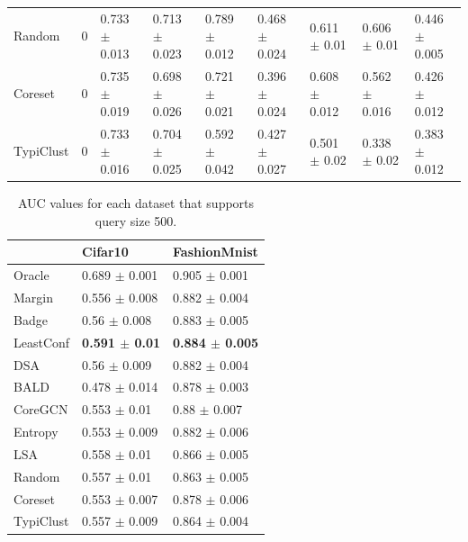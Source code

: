 \documentclass[]{article}
\begin{document}
\begin{table}[H]
{\begin{tabular}{l|llllllll}
			Random & 0 & 0.733 $\pm$ {\small 0.013} & 0.713 $\pm$ {\small 0.023} & 0.789 $\pm$ {\small 0.012} & 0.468 $\pm$ {\small 0.024} & 0.611 $\pm$ {\small 0.01} & 0.606 $\pm$ {\small 0.01} & 0.446 $\pm$ {\small 0.005} \\
			Coreset & 0 & 0.735 $\pm$ {\small 0.019} & 0.698 $\pm$ {\small 0.026} & 0.721 $\pm$ {\small 0.021} & 0.396 $\pm$ {\small 0.024} & 0.608 $\pm$ {\small 0.012} & 0.562 $\pm$ {\small 0.016} & 0.426 $\pm$ {\small 0.012} \\
			TypiClust & 0 & 0.733 $\pm$ {\small 0.016} & 0.704 $\pm$ {\small 0.025} & 0.592 $\pm$ {\small 0.042} & 0.427 $\pm$ {\small 0.027} & 0.501 $\pm$ {\small 0.02} & 0.338 $\pm$ {\small 0.02} & 0.383 $\pm$ {\small 0.012} \\
		\end{tabular}
	}
\end{table}
\begin{minipage}{0.47\linewidth}
	\begin{table}[H]
		\caption{AUC values for each dataset that supports query size 500.}
		\begin{tabular}{l|ll}
			& Cifar10 & FashionMnist \\
			\hline
			Oracle & 0.689 $\pm$ {\small 0.001} & 0.905 $\pm$ {\small 0.001} \\
			Margin & 0.556 $\pm$ {\small 0.008} & 0.882 $\pm$ {\small 0.004} \\
			Badge & 0.56 $\pm$ {\small 0.008} & 0.883 $\pm$ {\small 0.005} \\
			LeastConf & \textbf{0.591 $\pm$ {\small 0.01}} & \textbf{0.884 $\pm$ {\small 0.005}} \\
			DSA & 0.56 $\pm$ {\small 0.009} & 0.882 $\pm$ {\small 0.004} \\
			BALD & 0.478 $\pm$ {\small 0.014} & 0.878 $\pm$ {\small 0.003} \\
			CoreGCN & 0.553 $\pm$ {\small 0.01} & 0.88 $\pm$ {\small 0.007} \\
			Entropy & 0.553 $\pm$ {\small 0.009} & 0.882 $\pm$ {\small 0.006} \\
			LSA & 0.558 $\pm$ {\small 0.01} & 0.866 $\pm$ {\small 0.005} \\
			Random & 0.557 $\pm$ {\small 0.01} & 0.863 $\pm$ {\small 0.005} \\
			Coreset & 0.553 $\pm$ {\small 0.007} & 0.878 $\pm$ {\small 0.006} \\
			TypiClust & 0.557 $\pm$ {\small 0.009} & 0.864 $\pm$ {\small 0.004}
		\end{tabular}
	\end{table}
\end{minipage}
\end{document}
